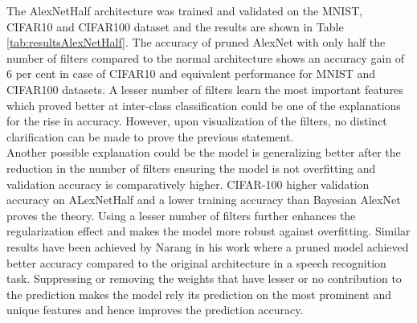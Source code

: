 The AlexNetHalf architecture was trained and validated on the MNIST, CIFAR10 and CIFAR100 dataset and the results are shown in Table \ref{tab:resultsAlexNetHalf}. The accuracy of pruned AlexNet with only half the number of filters compared to the normal architecture shows an accuracy gain of 6 per cent in case of CIFAR10 and equivalent performance for MNIST and CIFAR100 datasets. A lesser number of filters learn the most important features which proved better at inter-class classification could be one of the explanations for the rise in accuracy. However, upon visualization of the filters, no distinct clarification can be made to prove the previous statement. \\ 
Another possible explanation could be the model is generalizing better after the reduction in the number of filters ensuring the model is not overfitting and validation accuracy is comparatively higher. CIFAR-100 higher validation accuracy on ALexNetHalf and a lower training accuracy than Bayesian AlexNet proves the theory. Using a lesser number of filters further enhances the regularization effect and makes the model more robust against overfitting. Similar results have been achieved by Narang \cite{DBLP:journals/corr/NarangDSE17} in his work where a pruned model achieved better accuracy compared to the original architecture in a speech recognition task. Suppressing or removing the weights that have lesser or no contribution to the prediction makes the model rely its prediction on the most prominent and unique features and hence improves the prediction accuracy.

\begin{table}[H]
\tiny
    \centering
    \renewcommand{\arraystretch}{1.5}
    \renewcommand{\arraystretch}{1.5}
    \caption{Comparison of validation accuracies (in percentage) for AlexNet with variational inference (VI), AlexNet with frequentist inference and AlexNet with half number of filters halved for MNIST, CIFAR-10 and CIFAR-100 datasets.}
    \label{tab:resultsAlexNetHalf}
\end{table}

